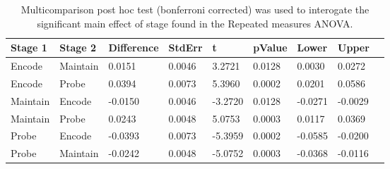 \begin{table}
\centering
\begin{tabular}[0.2em]{@{}lllllllll@{}}\toprule
Stage 1 & Stage 2 & Difference & StdErr & t & pValue & Lower & Upper\\\toprule[0.2em]
Encode & Maintain & 0.0151 & 0.0046 & 3.2721 & 0.0128 & 0.0030 & 0.0272 \\\midrule
Encode & Probe & 0.0394 & 0.0073 & 5.3960 & 0.0002 & 0.0201 & 0.0586 \\\midrule
Maintain & Encode & -0.0150 & 0.0046 & -3.2720 & 0.0128 & -0.0271 & -0.0029 \\\midrule
Maintain & Probe & 0.0243 & 0.0048 & 5.0753 & 0.0003 & 0.0117 & 0.0369 \\\midrule
Probe & Encode & -0.0393 & 0.0073 & -5.3959 & 0.0002 & -0.0585 & -0.0200 \\\midrule
Probe & Maintain & -0.0242 & 0.0048 & -5.0752 & 0.0003 & -0.0368 & -0.0116 \\\bottomrule[0.2em]
\end{tabular}
\caption{Multicomparison post hoc test (bonferroni corrected) was used to interogate the significant main effect of stage found in the Repeated measures ANOVA.\label{tabel:tbl_RMAAFC1_PH_Stage}}
\end{table}
